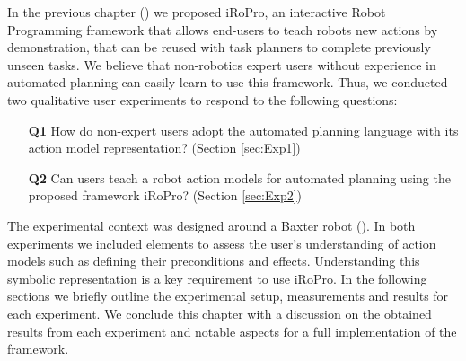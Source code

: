 
In the previous chapter () we proposed iRoPro, an interactive Robot Programming framework that allows end-users to teach robots new actions by demonstration, that can be reused with task planners to complete previously unseen tasks.
We believe that non-robotics expert users without experience in automated planning can easily learn to use this framework.
Thus, %
we conducted two qualitative user experiments to respond to the following questions:
\begin{enumerate}
  \item[\textbf{Q1}] How do non-expert users adopt the automated planning language with its action model representation? (Section \ref{sec:Exp1})
  \item[\textbf{Q2}] Can users teach a robot action models for automated planning using the proposed framework iRoPro? (Section \ref{sec:Exp2})
\end{enumerate}

The experimental context was designed around a Baxter robot ().
In both experiments we included elements to assess the user's understanding of action models such as defining their preconditions and effects.
Understanding this symbolic representation is a key requirement to use iRoPro.
In the following sections we briefly outline the experimental setup, measurements and results for each experiment.
We conclude this chapter with a discussion on the obtained results from each experiment and notable aspects for a full implementation of the framework.
 
